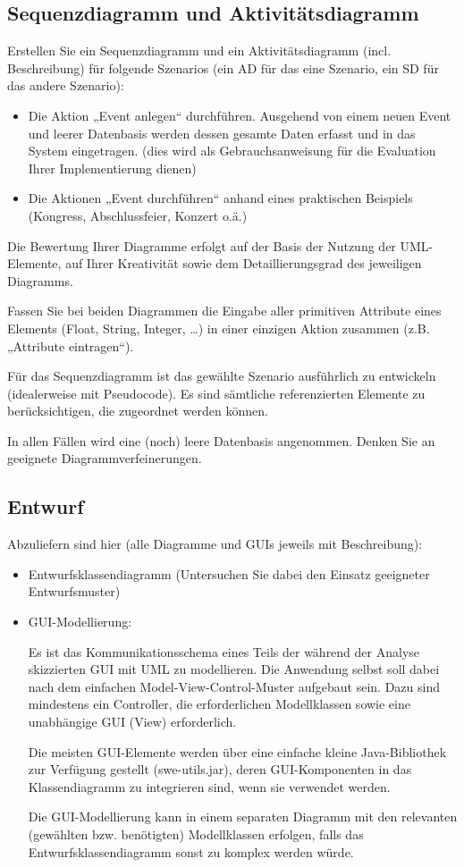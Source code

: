 \subsection{Sequenzdiagramm und Aktivitätsdiagramm}
Erstellen Sie ein Sequenzdiagramm und ein Aktivitätsdiagramm (incl. Beschreibung) für folgende Szenarios (ein AD für das eine Szenario, ein SD für das andere Szenario):
\begin{itemize}
    \item Die Aktion „Event anlegen“ durchführen. Ausgehend von einem neuen Event und leerer Datenbasis werden dessen gesamte Daten erfasst und in das System eingetragen. (dies wird als Gebrauchsanweisung für die Evaluation Ihrer Implementierung dienen)
    \item Die Aktionen „Event durchführen“ anhand eines praktischen Beispiels (Kongress, Abschlussfeier, Konzert o.ä.) 
\end{itemize}
Die Bewertung Ihrer Diagramme erfolgt auf der Basis der Nutzung der UML-Elemente, auf Ihrer Kreativität sowie dem Detaillierungsgrad des jeweiligen Diagramms.

Fassen Sie bei beiden Diagrammen die Eingabe aller primitiven Attribute eines Elements (Float, String, Integer, …) in einer einzigen Aktion zusammen (z.B. „Attribute eintragen“).

Für das Sequenzdiagramm ist das gewählte Szenario ausführlich zu entwickeln (idealerweise mit Pseudocode). Es sind sämtliche referenzierten Elemente zu berücksichtigen, die zugeordnet werden können. 

In allen Fällen wird eine (noch) leere Datenbasis angenommen. Denken Sie an geeignete Diagrammverfeinerungen. 

\subsection{Entwurf}
Abzuliefern sind hier (alle Diagramme und GUIs jeweils mit Beschreibung):
\begin{itemize}
    \item Entwurfsklassendiagramm (Untersuchen Sie dabei den Einsatz geeigneter Entwurfsmuster)
\item GUI-Modellierung:

Es ist das Kommunikationsschema eines Teils der während der Analyse skizzierten GUI mit UML zu modellieren. Die Anwendung selbst soll dabei nach dem einfachen Model-View-Control-Muster aufgebaut sein. Dazu sind mindestens ein Controller, die erforderlichen Modellklassen sowie eine unabhängige GUI (View) erforderlich.

Die meisten GUI-Elemente werden über eine einfache kleine Java-Bibliothek zur Verfügung gestellt (swe-utils.jar), deren GUI-Komponenten in das Klassendiagramm zu integrieren sind, wenn sie verwendet werden.

Die GUI-Modellierung kann in einem separaten Diagramm mit den relevanten (gewählten bzw. benötigten) Modellklassen erfolgen, falls das Entwurfsklassendiagramm sonst zu komplex werden würde. 
\end{itemize}
